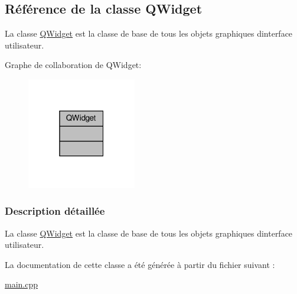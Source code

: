 \hypertarget{class_q_widget}{}\subsection{Référence de la classe Q\+Widget}
\label{class_q_widget}


La classe \hyperlink{class_q_widget}{Q\+Widget} est la classe de base de tous les objets graphiques d\textquotesingle{}interface utilisateur.  




Graphe de collaboration de Q\+Widget\+:\nopagebreak
\begin{figure}[H]
\begin{center}
\leavevmode
\includegraphics[width=135pt]{class_q_widget__coll__graph}
\end{center}
\end{figure}


\subsubsection{Description détaillée}
La classe \hyperlink{class_q_widget}{Q\+Widget} est la classe de base de tous les objets graphiques d\textquotesingle{}interface utilisateur. 

La documentation de cette classe a été générée à partir du fichier suivant \+:\begin{DoxyCompactItemize}
\item 
\hyperlink{main_8cpp}{main.\+cpp}\end{DoxyCompactItemize}
